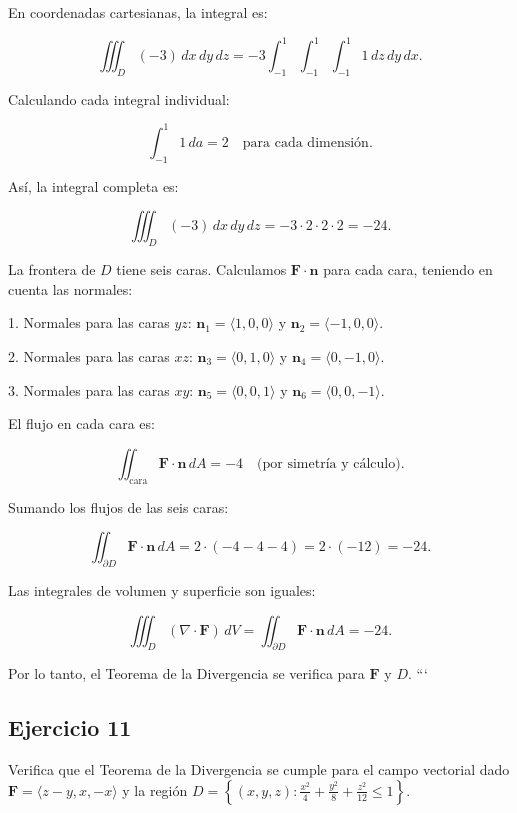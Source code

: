 \documentclass{report}
\begin{document}
En coordenadas cartesianas, la integral es:

\[
\iiint_{D} (-3) \, dx \, dy \, dz = -3 \int_{-1}^{1} \int_{-1}^{1} \int_{-1}^{1} 1 \, dz \, dy \, dx.
\]

Calculando cada integral individual:

\[
\int_{-1}^{1} 1 \, da = 2 \quad \text{para cada dimensión}.
\]

Así, la integral completa es:

\[
\iiint_{D} (-3) \, dx \, dy \, dz = -3 \cdot 2 \cdot 2 \cdot 2 = -24.
\]



La frontera de \( D \) tiene seis caras. Calculamos \( \mathbf{F} \cdot \mathbf{n} \) para cada cara, teniendo en cuenta las normales:

1. Normales para las caras \( yz \): \( \mathbf{n}_1 = \langle 1, 0, 0 \rangle \) y \( \mathbf{n}_2 = \langle -1, 0, 0 \rangle \).

2. Normales para las caras \( xz \): \( \mathbf{n}_3 = \langle 0, 1, 0 \rangle \) y \( \mathbf{n}_4 = \langle 0, -1, 0 \rangle \).

3. Normales para las caras \( xy \): \( \mathbf{n}_5 = \langle 0, 0, 1 \rangle \) y \( \mathbf{n}_6 = \langle 0, 0, -1 \rangle \).

El flujo en cada cara es:

\[
\iint_{\text{cara}} \mathbf{F} \cdot \mathbf{n} \, dA = -4 \quad \text{(por simetría y cálculo)}.
\]

Sumando los flujos de las seis caras:

\[
\iint_{\partial D} \mathbf{F} \cdot \mathbf{n} \, dA = 2 \cdot (-4 - 4 - 4) = 2 \cdot (-12) = -24.
\]



Las integrales de volumen y superficie son iguales:

\[
\iiint_{D} (\nabla \cdot \mathbf{F}) \, dV = \iint_{\partial D} \mathbf{F} \cdot \mathbf{n} \, dA = -24.
\]

Por lo tanto, el Teorema de la Divergencia se verifica para \( \mathbf{F} \) y \( D \).
```

\subsection*{Ejercicio 11}
Verifica que el Teorema de la Divergencia se cumple para el campo vectorial dado \( \mathbf{F}=\langle z-y, x,-x\rangle \) y la región \( D=\left\{(x, y, z): \frac{x^2}{4} + \frac{y^2}{8} + \frac{z^2}{12} \leq 1\right\} \).
\end{document}
